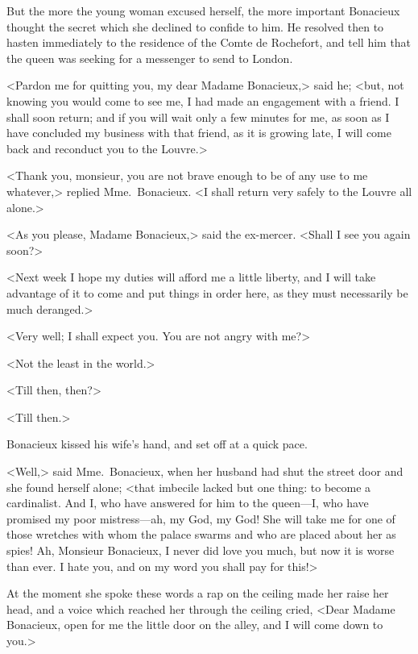 But the more the young woman excused herself, the more important Bonacieux thought the secret which she declined to confide to him. He resolved then to hasten immediately to the residence of the Comte de Rochefort, and tell him that the queen was seeking for a messenger to send to London. 

<Pardon me for quitting you, my dear Madame Bonacieux,> said he; <but, not knowing you would come to see me, I had made an engagement with a friend. I shall soon return; and if you will wait only a few minutes for me, as soon as I have concluded my business with that friend, as it is growing late, I will come back and reconduct you to the Louvre.> 

<Thank you, monsieur, you are not brave enough to be of any use to me whatever,> replied Mme.~Bonacieux. <I shall return very safely to the Louvre all alone.> 

<As you please, Madame Bonacieux,> said the ex-mercer. <Shall I see you again soon?> 

<Next week I hope my duties will afford me a little liberty, and I will take advantage of it to come and put things in order here, as they must necessarily be much deranged.> 

<Very well; I shall expect you. You are not angry with me?> 

<Not the least in the world.> 

<Till then, then?> 

<Till then.> 

Bonacieux kissed his wife's hand, and set off at a quick pace. 

<Well,> said Mme.~Bonacieux, when her husband had shut the street door and she found herself alone; <that imbecile lacked but one thing: to become a cardinalist. And I, who have answered for him to the queen—I, who have promised my poor mistress—ah, my God, my God! She will take me for one of those wretches with whom the palace swarms and who are placed about her as spies! Ah, Monsieur Bonacieux, I never did love you much, but now it is worse than ever. I hate you, and on my word you shall pay for this!> 

At the moment she spoke these words a rap on the ceiling made her raise her head, and a voice which reached her through the ceiling cried, <Dear Madame Bonacieux, open for me the little door on the alley, and I will come down to you.>
